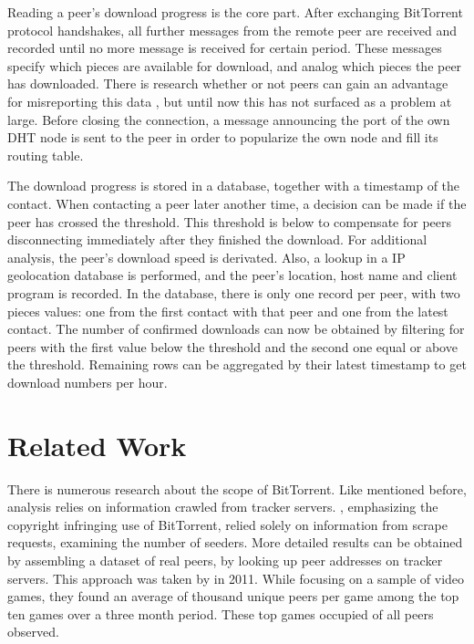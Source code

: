 \documentclass[10pt, a4paper, twoside, headsepline]{scrbook}
\renewcommand{\_}{\origunderscore\allowbreak}
\begin{document}
Reading a peer's download progress is the core part. After exchanging BitTorrent protocol handshakes, all further messages from the remote peer are received and recorded until no more message is received for certain period. These messages specify which pieces are available for download, and analog which pieces the peer has downloaded. There is research whether or not peers can gain an advantage for misreporting this data \cite{levin2008bittorrent}, but until now this has not surfaced as a problem at large. Before closing the connection, a message announcing the port of the own DHT node is sent to the peer in order to popularize the own node and fill its routing table.

The download progress is stored in a database, together with a timestamp of the contact. When contacting a peer later another time, a decision can be made if the peer has crossed the threshold. This threshold is below  to compensate for peers disconnecting immediately after they finished the download. For additional analysis, the peer's download speed is derivated. Also, a lookup in a IP geolocation database is performed, and the peer's location, host name and client program is recorded. In the database, there is only one record per peer, with two pieces values: one from the first contact with that peer and one from the latest contact. The number of confirmed downloads can now be obtained by filtering for peers with the first value below the threshold and the second one equal or above the threshold. Remaining rows can be aggregated by their latest timestamp to get download numbers per hour.

\section{Related Work}
There is numerous research about the scope of BitTorrent. Like mentioned before, analysis relies on information crawled from tracker servers. \textcite{watters2011much}, emphasizing the copyright infringing use of BitTorrent, relied solely on information from scrape requests, examining the number of seeders. More detailed results can be obtained by assembling a dataset of real peers, by looking up peer addresses on tracker servers. This approach was taken by \textcite{drachen2011distribution} in 2011. While focusing on a sample of  video games, they found an average of  thousand unique peers per game among the top ten games over a three month period. These top  games occupied  of all peers observed.
\end{document}
